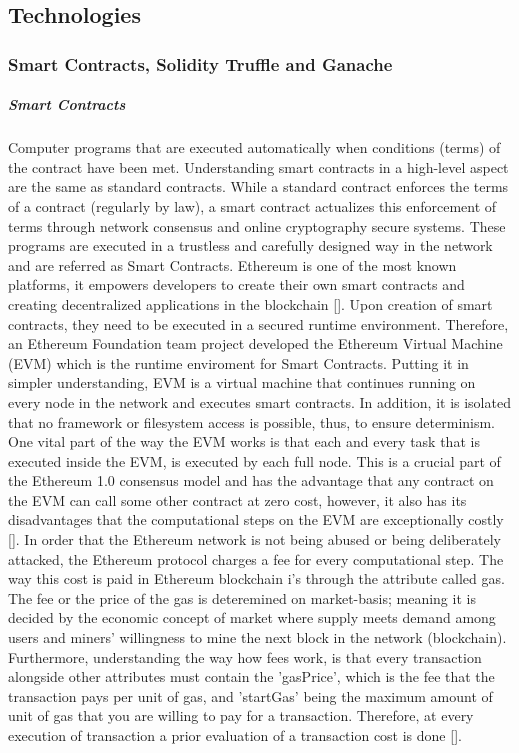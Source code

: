 \subsection{Technologies}


\subsubsection{Smart Contracts, Solidity Truffle and Ganache}

\subparagraph{Smart Contracts} 
Computer programs that are executed automatically when conditions (terms) of the contract have been met. Understanding smart contracts in a high-level aspect are the same as standard contracts. While a standard contract enforces the terms of a contract (regularly by law), a smart contract actualizes this enforcement of terms through network consensus and online cryptography secure systems. These programs are executed in a trustless and carefully designed way in the network and are referred as Smart Contracts. Ethereum is one of the most known platforms, it empowers developers to create their own smart contracts and creating decentralized applications in the blockchain [\cite{Buterin2014}]. Upon creation of smart contracts, they need to be executed in a secured runtime environment. Therefore, an Ethereum Foundation team project developed the Ethereum Virtual Machine (EVM) which is the runtime enviroment for Smart Contracts. Putting it in simpler understanding, EVM is a virtual machine that continues running on every node in the network and executes smart contracts. In addition, it is isolated that no framework or filesystem access is possible, thus, to ensure determinism. One vital part of the way the EVM works is that each and every task that is executed inside the EVM, is executed by each full node. This is a crucial part of the Ethereum 1.0 consensus model and has the advantage that any contract on the EVM can call some other contract at zero cost, however, it also has its disadvantages that the computational steps on the EVM are exceptionally costly [\cite{Buterin2014}]. In order that the Ethereum network is not being abused or being deliberately attacked, the Ethereum protocol charges a fee for every computational step. The way this cost is paid in Ethereum blockchain i’s through the attribute called gas. The fee or the price of the gas is deteremined on market-basis; meaning it is decided by the economic concept of market where supply meets demand among users and miners' willingness to mine the next block in the network (blockchain). Furthermore, understanding the way how fees work, is that every transaction alongside other attributes must contain the 'gasPrice', which is the fee that the transaction pays per unit of gas, and 'startGas' being the maximum amount of unit of gas that you are willing to pay for a transaction. Therefore, at every execution of transaction a prior evaluation of a transaction cost is done [\cite{Buterin2014}].
